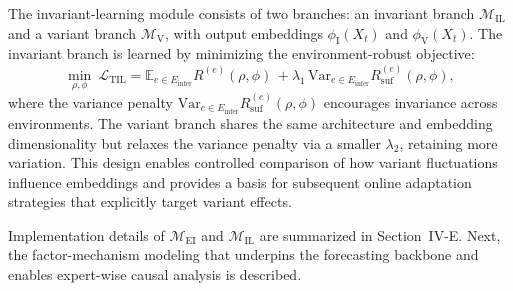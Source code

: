 ﻿\documentclass[journal]{IEEEtran}
\begin{document}
The invariant-learning module consists of two branches: an invariant branch $\mathcal{M}_{\mathrm{IL}}$ and a variant branch $\mathcal{M}_{\mathrm{V}}$, with output embeddings $\phi_{\mathrm{I}}(X_t)$ and $\phi_{\mathrm{V}}(X_t)$. The invariant branch is learned by minimizing the environment-robust objective:
\begin{equation}
\min_{\rho,\phi}\ \mathcal{L}_{\mathrm{TIL}}
=\mathbb{E}_{e\in E_{\mathrm{infer}}}R^{(e)}(\rho,\phi)
\,+\lambda_1\,\mathrm{Var}_{e\in E_{\mathrm{infer}}} R_{\mathrm{suf}}^{(e)}(\rho,\phi),
\end{equation}
where the variance penalty $\mathrm{Var}_{e\in E_{\mathrm{infer}}} R_{\mathrm{suf}}^{(e)}(\rho,\phi)$ encourages invariance across environments. The variant branch shares the same architecture and embedding dimensionality but relaxes the variance penalty via a smaller $\lambda_2$, retaining more variation. This design enables controlled comparison of how variant fluctuations influence embeddings and provides a basis for subsequent online adaptation strategies that explicitly target variant effects. 

Implementation details of $\mathcal{M}_{\mathrm{EI}}$ and $\mathcal{M}_{\mathrm{IL}}$ are summarized in Section~IV-E. Next, the factor-mechanism modeling that underpins the forecasting backbone and enables expert-wise causal analysis is described.
\end{document}
